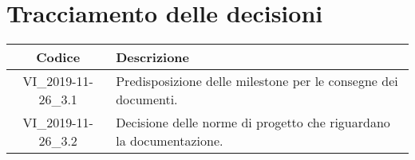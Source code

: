 \section*{Tracciamento delle decisioni}

\begin{center}
	\begin{longtable}{|c|p{12.25cm}|}
	\hline
	\rowcolor{lighter-grayer}
	\textbf{Codice} & \textbf{Descrizione} \\
	\hline
	\endfirsthead

	\hline
	VI\_2019-11-26\_3.1 & Predisposizione delle milestone per le consegne dei documenti. \\
	VI\_2019-11-26\_3.2 & Decisione delle norme di progetto che riguardano la documentazione. \\
	\hline

	\end{longtable}
\end{center}
